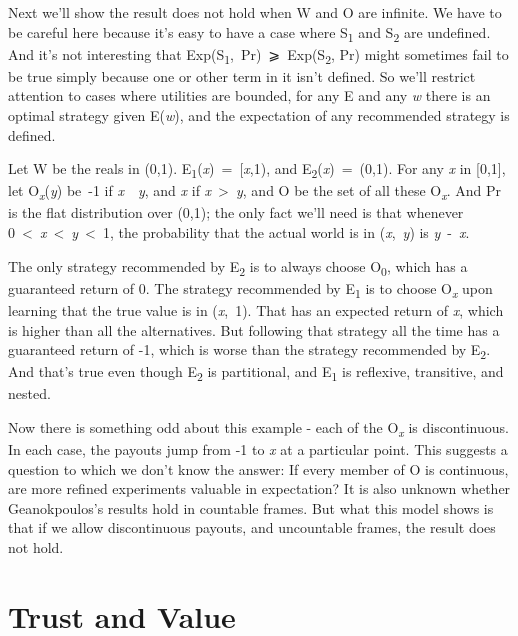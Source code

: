 \documentclass[
  10pt,
  letterpaper,
  DIV=11,
  numbers=noendperiod,
  twoside]{scrartcl}
\begin{document}
Next we'll show the result does not hold when W and O are infinite. We
have to be careful here because it's easy to have a case where
S\textsubscript{1} and S\textsubscript{2} are undefined. And it's not
interesting that Exp(S\textsubscript{1},~Pr)~⩾~Exp(S\textsubscript{2},
Pr) might sometimes fail to be true simply because one or other term in
it isn't defined. So we'll restrict attention to cases where utilities
are bounded, for any E and any \emph{w} there is an optimal strategy
given E(\emph{w}), and the expectation of any recommended strategy is
defined.

Let W be the reals in (0,1).
E\textsubscript{1}(\emph{x})~=~{[}\emph{x},1), and
E\textsubscript{2}(\emph{x})~=~(0,1). For any \emph{x} in {[}0,1{]}, let
O\textsubscript{\emph{x}}(\emph{y}) be~-1 if \emph{x}~\geq~\emph{y}, and
\emph{x} if \emph{x}~\textgreater~\emph{y}, and O be the set of all
these O\textsubscript{\emph{x}}. And Pr is the flat distribution over
(0,1); the only fact we'll need is that whenever
0~\textless~\emph{x}~\textless~\emph{y}~\textless~1, the probability
that the actual world is in (\emph{x},~\emph{y}) is \emph{y}~-~\emph{x}.

The only strategy recommended by E\textsubscript{2} is to always choose
O\textsubscript{0}, which has a guaranteed return of 0. The strategy
recommended by E\textsubscript{1} is to choose O\textsubscript{\emph{x}}
upon learning that the true value is in (\emph{x},~1). That has an
expected return of \emph{x}, which is higher than all the alternatives.
But following that strategy all the time has a guaranteed return of -1,
which is worse than the strategy recommended by E\textsubscript{2}. And
that's true even though E\textsubscript{2} is partitional, and
E\textsubscript{1} is reflexive, transitive, and nested.

Now there is something odd about this example - each of the
O\textsubscript{\emph{x}} is discontinuous. In each case, the payouts
jump from -1 to \emph{x} at a particular point. This suggests a question
to which we don't know the answer: If every member of O is continuous,
are more refined experiments valuable in expectation? It is also unknown
whether Geanokpoulos's results hold in countable frames. But what this
model shows is that if we allow discontinuous payouts, and uncountable
frames, the result does not hold.

\section{Trust and Value}\label{sec-dorst}
\end{document}
